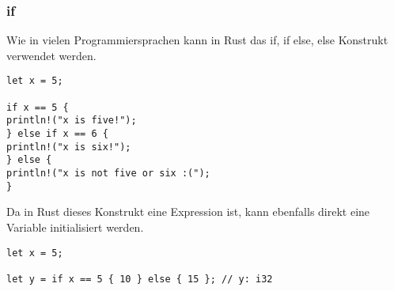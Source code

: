 \subsubsection{if}
Wie in vielen Programmiersprachen kann in Rust das if, if else, else Konstrukt verwendet werden.

\begin{lstlisting}
let x = 5;

if x == 5 {
println!("x is five!");
} else if x == 6 {
println!("x is six!");
} else {
println!("x is not five or six :(");
}
\end{lstlisting}

Da in Rust dieses Konstrukt eine Expression ist, kann ebenfalls direkt eine Variable initialisiert werden.

\begin{lstlisting}
let x = 5;

let y = if x == 5 { 10 } else { 15 }; // y: i32
\end{lstlisting}